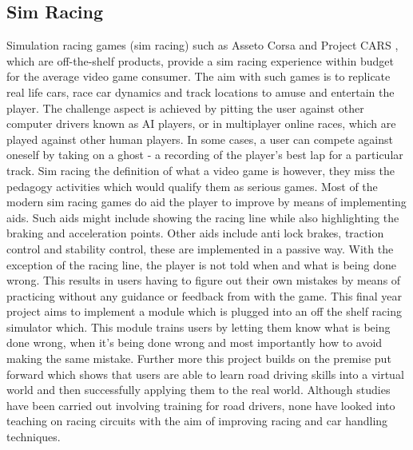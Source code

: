 \subsection{Sim Racing}
Simulation racing games (sim racing) such as Asseto Corsa \cite{assestoCorsa} and Project CARS \cite{ProjectCars} , which are off-the-shelf products, provide a sim racing experience within budget for the average video game consumer. The aim with such games is to replicate real life cars, race car dynamics and track locations to amuse and entertain the player. The challenge aspect is achieved by pitting the user against other computer drivers known as AI players, or in multiplayer online races, which are played against other human players. In some cases, a user can compete against oneself by taking on a ghost - a recording of the player's best lap for a particular track. Sim racing the definition of what a video game is however, they miss the pedagogy activities which would qualify them as serious games. Most of the modern sim racing games do aid the player to improve by means of implementing aids. Such aids might include showing the racing line while also highlighting the braking and acceleration points. Other aids include anti lock brakes, traction control and stability control, these are implemented in a passive way. With the exception of the racing line, the player is not told when and what is being done wrong. This results in users having to figure out their own mistakes by means of practicing without any guidance or feedback from with the game. This final year project aims to implement a module which is plugged into an off the shelf racing simulator which. This module trains users by letting them know what is being done wrong, when it's being done wrong and most importantly how to avoid making the same mistake. Further more this project builds on the premise put forward which shows that users are able to learn road driving skills into a virtual world and then successfully applying them to the real world\cite{li2015can}\cite{vogel2006computer}. Although studies have been carried out involving training for road drivers, none have looked into teaching on racing circuits with the aim of improving racing and car handling techniques. 

\newpage